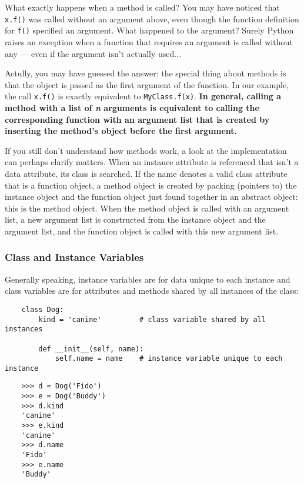 \documentclass[UTF8]{article}
\begin{document}
What exactly happens when a method is called? You may have noticed that \texttt{x.f()} was called
without an argument above, even though the function definition for \texttt{f()} specified an
argument. What happened to the argument? Surely Python raises an exception when a function that
requires an argument is called without any --- even if the argument isn't actually used...

Actully, you may have guessed the answer: the special thing about methods is that the object is
passed as the first argument of the function. In our example, the call \texttt{x.f()} is exactly
equivalent to \texttt{MyClass.f(x)}. \textbf{In general, calling a method with a list of \emph{n}
arguments is equivalent to calling the corresponding function with an argument list that is created
by inserting the method's object before the first argument.}

If you still don't understand how methods work, a look at the implementation can perhaps clarify
matters. When an instance attribute is referenced that isn't a data attribute, its class is
searched. If the name denotes a valid class attribute that is a function object, a method object is
created by packing (pointers to) the instance object and the function object just found together in
an abstract object: this is the method object. When the method object is called with an argument
list, a new argument list is constructed from the instance object and the argument list, and the
function object is called with this new argument list.

\subsubsection{Class and Instance Variables}
Generally speaking, instance variables are for data unique to each instance and class variables are
for attributes and methods shared by all instances of the class:
\begin{verbatim}
    class Dog:
        kind = 'canine'         # class variable shared by all instances

        def __init__(self, name):
            self.name = name    # instance variable unique to each instance
\end{verbatim}
\begin{verbatim}
    >>> d = Dog('Fido')
    >>> e = Dog('Buddy')
    >>> d.kind
    'canine'
    >>> e.kind
    'canine'
    >>> d.name
    'Fido'
    >>> e.name
    'Buddy'
\end{verbatim}
\end{document}
